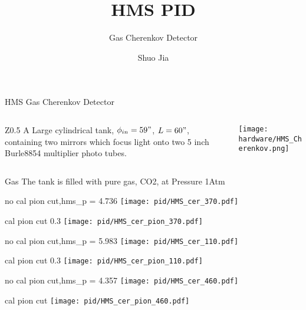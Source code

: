 \documentclass[aspectratio=169,xcolor=dvipsnames]{beamer}
\title{HMS PID }
\subtitle{Gas Cherenkov Detector}
\date{}
\author{Shuo Jia}
\begin{document}
\maketitle





\begin{frame}{HMS Gas Cherenkov Detector}
  \begin{columns}
    \begin{column}[T]Z{0.5\textwidth}
    A Large cylindrical tank, $\phi_{in} = 59 "$, $L = 60"$, containing two mirrors which focus light onto two 5 inch Burle8854 multiplier photo tubes. 
     \end{column}
    \begin{column}[T]{0.5\textwidth}
      \texttt{[image: hardware/HMS\_Cherenkov.png]}
    \end{column}
  \end{columns}
\end{frame}{}

\begin{frame}{Gas}
  The tank is filled with pure gas, CO2, at Pressure 1Atm
\end{frame}

\begin{frame}{no cal pion cut,hms_p = 4.736}
  \texttt{[image: pid/HMS\_cer\_370.pdf]}
\end{frame}

\begin{frame}{cal pion cut 0.3}
  \texttt{[image: pid/HMS\_cer\_pion\_370.pdf]}
\end{frame}

\begin{frame}{no cal pion cut,hms_p = 5.983}
  \texttt{[image: pid/HMS\_cer\_110.pdf]}
\end{frame}

\begin{frame}{cal pion cut 0.3}
  \texttt{[image: pid/HMS\_cer\_pion\_110.pdf]}
\end{frame}

\begin{frame}{no cal pion cut,hms_p = 4.357}
  \texttt{[image: pid/HMS\_cer\_460.pdf]}
\end{frame}

\begin{frame}{cal pion cut }
  \texttt{[image: pid/HMS\_cer\_pion\_460.pdf]}
\end{frame}
\end{document}

